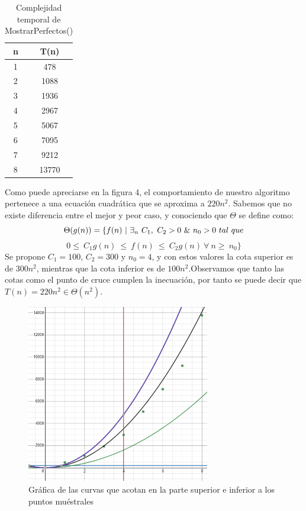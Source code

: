 \documentclass[12pt,twoside]{article}
\begin{document}
\begin{longtable}{||c|c||}
        \caption{Complejidad temporal de MostrarPerfectos()}\\
            \hline
                \textbf{n}&\textbf{T(n)}\\
            \hline
                {1}&{478}\\
            \hline
                {2}&{1088}\\
            \hline
                {3}&{1936}\\
            \hline
                {4}&{2967}\\
            \hline
                {5}&{5067}\\
            \hline
                {6}&{7095}\\
            \hline
                {7}&{9212}\\
            \hline
                {8}&{13770}\\
            \hline
\end{longtable}
Como puede apreciarse en la figura 4, el comportamiento de nuestro algoritmo pertenece a una ecuación cuadrática que se aproxima a $220n^2$. Sabemos que no existe diferencia entre el mejor y peor caso, y conociendo que $\Theta$ se define como:
$$\Theta(g(n)) = \{ f(n)~\arrowvert~\exists_{n}~C_{1},~C_{2}>0~\&~n_{0}>0~tal~que$$ $$0\leq~C_{1}g(n)~\leq~f(n)~\leq~C_{2}g(n)~\forall~n\geq~n_{0}\}$$
Se propone $C_{1}=100$, $C_{2}=300$ y $n_{0}=4$, y con estos valores la cota superior es de $300n^2$, mientras que la cota inferior es de $100n^2$.Observamos que tanto las cotas como el punto de cruce cumplen la inecuaci\'on, por tanto se puede decir que $T(n)=220n^2 \in \Theta(n^2)$.


\begin{figure}[h]
    \centering
    \includegraphics[width=8cm]{imagenes/grafica2-2a.png}
    \caption{Gr\'afica de las curvas que acotan en la parte superior e inferior a los puntos mu\'estrales}
    \label{fig:my_label}
\end{figure}  
\end{document}

